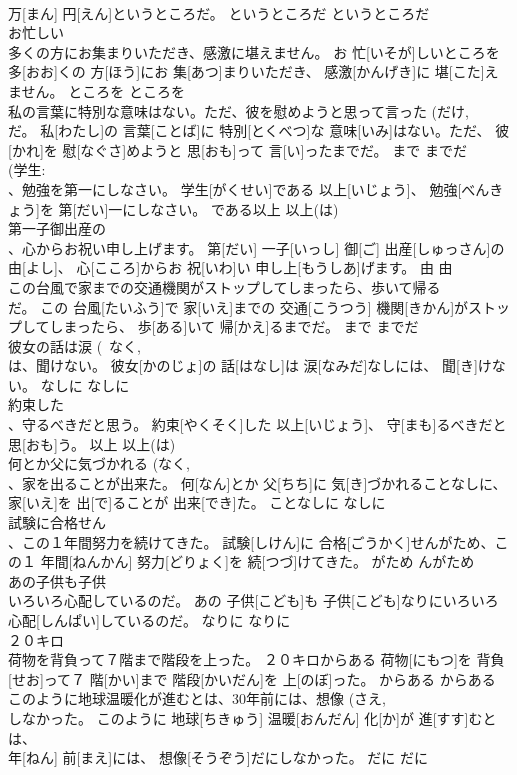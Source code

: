 \documentclass[8pt]{extreport}
\begin{document}
\begin{CJK}{UTF8}{min}
\\	万[まん] 円[えん]というところだ。	というところだ	というところだ	
\\	お忙しい 
\\	多くの方にお集まりいただき、感激に堪えません。	お 忙[いそが]しいところを 多[おお]くの 方[ほう]にお 集[あつ]まりいただき、 感激[かんげき]に 堪[こた]えません。	ところを	ところを	
\\	私の言葉に特別な意味はない。ただ、彼を慰めようと思って言った (だけ, 
\\	だ。	私[わたし]の 言葉[ことば]に 特別[とくべつ]な 意味[いみ]はない。ただ、 彼[かれ]を 慰[なぐさ]めようと 思[おも]って 言[い]ったまでだ。	まで	までだ	
\\	(学生:
\\	、勉強を第一にしなさい。	学生[がくせい]である 以上[いじょう]、 勉強[べんきょう]を 第[だい]一にしなさい。	である以上	以上(は)	
\\	第一子御出産の 
\\	、心からお祝い申し上げます。	第[だい] 一子[いっし] 御[ご] 出産[しゅっさん]の 由[よし]、 心[こころ]からお 祝[いわ]い 申し上[もうしあ]げます。	由	由	
\\	この台風で家までの交通機関がストップしてしまったら、歩いて帰る 
\\	だ。	この 台風[たいふう]で 家[いえ]までの 交通[こうつう] 機関[きかん]がストップしてしまったら、 歩[ある]いて 帰[かえ]るまでだ。	まで	までだ	
\\	彼女の話は涙 (~なく, 
\\	は、聞けない。	彼女[かのじょ]の 話[はなし]は 涙[なみだ]なしには、 聞[き]けない。	なしに	なしに	
\\	約束した 
\\	、守るべきだと思う。	約束[やくそく]した 以上[いじょう]、 守[まも]るべきだと 思[おも]う。	以上	以上(は)	
\\	何とか父に気づかれる (なく, 
\\	、家を出ることが出来た。	何[なん]とか 父[ちち]に 気[き]づかれることなしに、 家[いえ]を 出[で]ることが 出来[でき]た。	ことなしに	なしに	
\\	試験に合格せん 
\\	、この１年間努力を続けてきた。	試験[しけん]に 合格[ごうかく]せんがため、この１ 年間[ねんかん] 努力[どりょく]を 続[つづ]けてきた。	がため	んがため	
\\	あの子供も子供 
\\	いろいろ心配しているのだ。	あの 子供[こども]も 子供[こども]なりにいろいろ 心配[しんぱい]しているのだ。	なりに	なりに	
\\	２０キロ 
\\	荷物を背負って７階まで階段を上った。	２０キロからある 荷物[にもつ]を 背負[せお]って７ 階[かい]まで 階段[かいだん]を 上[のぼ]った。	からある	からある	
\\	このように地球温暖化が進むとは、30年前には、想像 (さえ, 
\\	しなかった。	このように 地球[ちきゅう] 温暖[おんだん] 化[か]が 進[すす]むとは、 
\\	年[ねん] 前[まえ]には、 想像[そうぞう]だにしなかった。	だに	だに	
\end{CJK}
\end{document}
